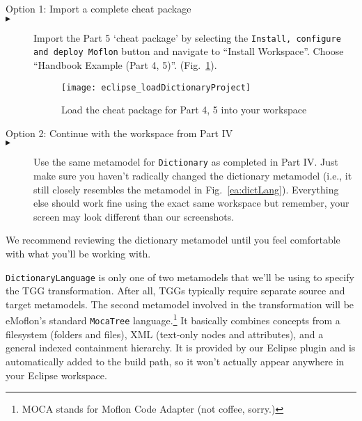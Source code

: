 \begin{description}

\item[Option 1: Import a complete cheat package]

\item[$\blacktriangleright$] \hspace{0.3cm} Import the Part 5 `cheat package' by selecting the \texttt{Install, configure and deploy Moflon} button and navigate to ``Install Workspace''. Choose ``Handbook Example (Part 4, 5)''. (Fig.~\ref{eclipse_cheatPackage}).

\begin{figure}[htbp]
\begin{center}
  \texttt{[image: eclipse\_loadDictionaryProject]}
  \caption{Load the cheat package for Part 4, 5 into your workspace}
  \label{eclipse_cheatPackage}
\end{center}
\end{figure}

\vspace{0.5cm}

\item[Option 2: Continue with the workspace from Part IV]


\item[$\blacktriangleright$] \hspace{0.3cm} Use the same metamodel for \texttt{Dictionary} as completed in Part IV. Just make sure you haven't radically changed
the dictionary metamodel (i.e., it still closely resembles the metamodel in Fig.~\ref{ea:dictLang}). Everything
else should work fine using the exact same workspace but remember, your screen may look different than our screenshots.

\end{description}


We recommend reviewing the dictionary metamodel until you feel comfortable with what you'll be working with. 


\texttt{DictionaryLanguage} is only one of two metamodels that we'll be using to specify the TGG transformation. After all, TGGs typically require separate
source and target metamodels. The second metamodel involved in the transformation will be eMoflon's standard \texttt{MocaTree} language.\footnote{MOCA stands
for Moflon Code Adapter (not coffee, sorry.)} It basically combines concepts from a filesystem (folders and files), XML (text-only nodes and attributes), and a
general indexed containment hierarchy. It is provided by our Eclipse plugin and is automatically added to the build path, so it won't actually appear
anywhere in your Eclipse workspace.

